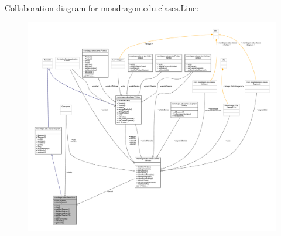 Collaboration diagram for mondragon.\+edu.\+clases.\+Line\+:
\nopagebreak
\begin{figure}[H]
\begin{center}
\leavevmode
\includegraphics[width=350pt]{classmondragon_1_1edu_1_1clases_1_1_line__coll__graph}
\end{center}
\end{figure}
